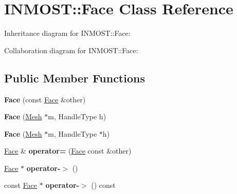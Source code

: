 \hypertarget{classINMOST_1_1Face}{\section{I\-N\-M\-O\-S\-T\-:\-:Face Class Reference}
\label{classINMOST_1_1Face}
}


Inheritance diagram for I\-N\-M\-O\-S\-T\-:\-:Face\-:


Collaboration diagram for I\-N\-M\-O\-S\-T\-:\-:Face\-:
\subsection*{Public Member Functions}
\begin{DoxyCompactItemize}
\item 
\hypertarget{classINMOST_1_1Face_a53034833744bd5d87a3ae6d933651145}{{\bfseries Face} (const \hyperlink{classINMOST_1_1Face}{Face} \&other)}\label{classINMOST_1_1Face_a53034833744bd5d87a3ae6d933651145}

\item 
\hypertarget{classINMOST_1_1Face_acb563a6337c86a4cf94a710e4e999713}{{\bfseries Face} (\hyperlink{classINMOST_1_1Mesh}{Mesh} $\ast$m, Handle\-Type h)}\label{classINMOST_1_1Face_acb563a6337c86a4cf94a710e4e999713}

\item 
\hypertarget{classINMOST_1_1Face_a9e972af360efe84b5024c5462b6febc8}{{\bfseries Face} (\hyperlink{classINMOST_1_1Mesh}{Mesh} $\ast$m, Handle\-Type $\ast$h)}\label{classINMOST_1_1Face_a9e972af360efe84b5024c5462b6febc8}

\item 
\hypertarget{classINMOST_1_1Face_a6a6f3c1fbe976e4190b65ef840761963}{\hyperlink{classINMOST_1_1Face}{Face} \& {\bfseries operator=} (\hyperlink{classINMOST_1_1Face}{Face} const \&other)}\label{classINMOST_1_1Face_a6a6f3c1fbe976e4190b65ef840761963}

\item 
\hypertarget{classINMOST_1_1Face_a230d80b0f802ce707bba105de43b9245}{\hyperlink{classINMOST_1_1Face}{Face} $\ast$ {\bfseries operator-\/$>$} ()}\label{classINMOST_1_1Face_a230d80b0f802ce707bba105de43b9245}

\item 
\hypertarget{classINMOST_1_1Face_aab957de5751d121cd10b1d397bd97986}{const \hyperlink{classINMOST_1_1Face}{Face} $\ast$ {\bfseries operator-\/$>$} () const }\label{classINMOST_1_1Face_aab957de5751d121cd10b1d397bd97986}


\end{DoxyCompactItemize}
